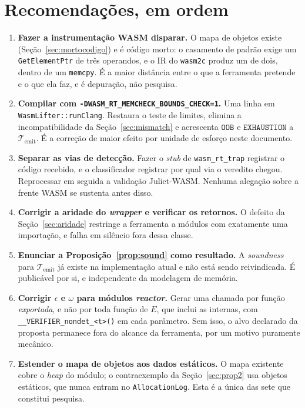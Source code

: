 \documentclass[11pt,a4paper]{article}
\theoremstyle{definition}
\newcommand{\code}[1]{\texttt{#1}}
\begin{document}
\section{Recomendações, em ordem}

\begin{enumerate}[leftmargin=1.6em]
  \item \textbf{Fazer a instrumentação WASM disparar.} O mapa de objetos existe
        (Seção~\ref{sec:mortocodigo}) e é código morto: o casamento de padrão
        exige um \code{GetElementPtr} de três operandos, e o IR do \code{wasm2c}
        produz um de dois, dentro de um \code{memcpy}. É a maior distância entre
        o que a ferramenta pretende e o que ela faz, e é depuração, não
        pesquisa.
  \item \textbf{Compilar com \code{-DWASM\_RT\_MEMCHECK\_BOUNDS\_CHECK=1}.} Uma
        linha em \code{WasmLifter::runClang}. Restaura o teste de limites,
        elimina a incompatibilidade da Seção~\ref{sec:mismatch} e acrescenta
        $\mathtt{OOB}$ e $\mathtt{EXHAUSTION}$ a $\mathcal{T}_{\mathrm{emit}}$. É
        a correção de maior efeito por unidade de esforço neste documento.
  \item \textbf{Separar as vias de detecção.} Fazer o \emph{stub} de
        \code{wasm\_rt\_trap} registrar o código recebido, e o classificador
        registrar por qual via o veredito chegou. Reprocessar em seguida a
        validação Juliet-WASM. Nenhuma alegação sobre a frente WASM se sustenta
        antes disso.
  \item \textbf{Corrigir a aridade do \emph{wrapper} e verificar os retornos.} O
        defeito da Seção~\ref{sec:aridade} restringe a ferramenta a módulos com
        exatamente uma importação, e falha em silêncio fora dessa classe.
  \item \textbf{Enunciar a Proposição~\ref{prop:sound} como resultado.} A
        \emph{soundness} para $\mathcal{T}_{\mathrm{emit}}$ já existe na
        implementação atual e não está sendo reivindicada. É publicável por si, e
        independente da modelagem de memória.
  \item \textbf{Corrigir $\epsilon$ e $\omega$ para módulos \emph{reactor}.} Gerar
        uma chamada por função \emph{exportada}, e não por toda função de $E$,
        que inclui as internas, com \code{\_\_VERIFIER\_nondet\_<t>()} em cada
        parâmetro. Sem isso, o alvo declarado da proposta permanece fora do
        alcance da ferramenta, por um motivo puramente mecânico.
  \item \textbf{Estender o mapa de objetos aos dados estáticos.} O mapa existente
        cobre o \emph{heap} do módulo; o contraexemplo da Seção~\ref{sec:prop2}
        usa objetos estáticos, que nunca entram no \code{AllocationLog}. Esta é a
        única das sete que constitui pesquisa.
\end{enumerate}
\end{document}
